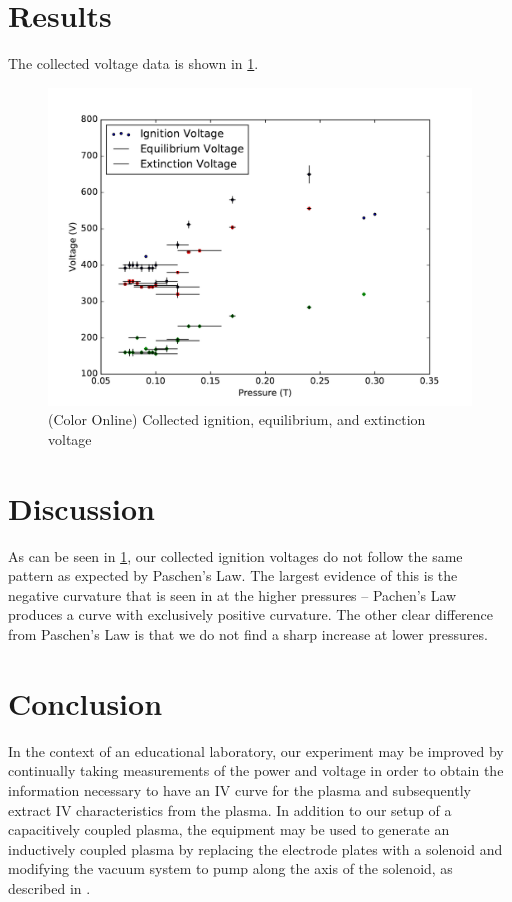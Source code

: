 \documentclass[reprint]{revtex4-1}
\begin{document}
\section{Results}

The collected voltage data is shown in \cref{fig:ignition-equilibrium-extinction}.

\begin{figure}[h]
\includegraphics[width=\columnwidth]{../resources/ignition-equilibrium-extinction.pdf}
\caption{(Color Online) Collected ignition, equilibrium, and extinction voltage}
\label{fig:ignition-equilibrium-extinction}
\end{figure}

\section{Discussion}

As can be seen in \cref{fig:ignition-equilibrium-extinction}, our collected ignition voltages do not follow the same pattern as expected by Paschen's Law. The largest evidence of this is the negative curvature that is seen in at the higher pressures -- Pachen's Law produces a curve with exclusively positive curvature. The other clear difference from Paschen's Law is that we do not find a sharp increase at lower pressures.

\section{Conclusion}

In the context of an educational laboratory, our experiment may be improved by continually taking measurements of the power and voltage in order to obtain the information necessary to have an IV curve for the plasma and subsequently extract IV characteristics from the plasma. In addition to our setup of a capacitively coupled plasma,  the equipment may be used to generate an inductively coupled plasma by replacing the electrode plates with a solenoid and modifying the vacuum system to pump along the axis of the solenoid, as described in \cite{physics-radio-frequency,Jiayin2010}.


\end{document}
